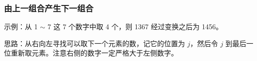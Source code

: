 \subsubsection{由上一组合产生下一组合}
	示例：从 1 $\sim$ 7 这 7 个数字中取 4 个，则 1367 经过变换之后为 1456。
	
	思路：从右向左寻找可以取下一个元素的数，记它的位置为 $j$，然后令 $j$ 到最后一位重新取元素。注意右侧的数字一定严格大于左侧数字。
	
	